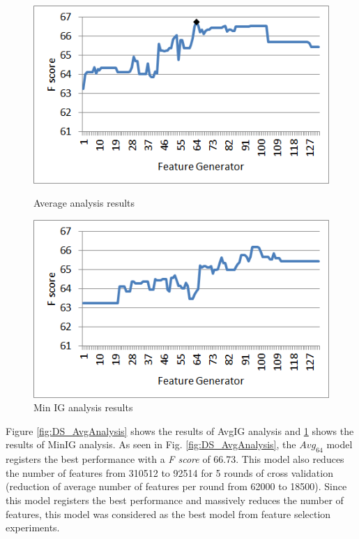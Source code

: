 \begin{figure}
\centering
\begin{minipage}{.5\textwidth}
  \centering
  \includegraphics[width=.95\textwidth]{figures/DSAvgAnalysis.png}
  \caption{Average analysis results}
  \label{fig:DS_AvgAnalysis}
\end{minipage}%
\begin{minipage}{.5\textwidth}
  \centering
  \includegraphics[width=.95\textwidth]{figures/DSMinAnalysis.png}
  \caption{Min IG analysis results}
  \label{fig:DS_MinAnalysis}
\end{minipage}
\end{figure}

Figure \ref{fig:DS_AvgAnalysis} shows the results of AvgIG analysis and \ref{fig:DS_MinAnalysis} shows the results of MinIG analysis. As seen in Fig. \ref{fig:DS_AvgAnalysis}, the $Avg_{64}$ model registers the best performance with a \textit{F score} of 66.73. This model also reduces the number of features from 310512 to 92514 for 5 rounds of cross validation (reduction of average number of features per round from 62000 to 18500). Since this model registers the best performance and massively reduces the number of features, this model was considered as the best model from feature selection experiments.

